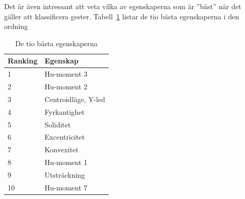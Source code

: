 \documentclass[../rapport_MVEX01-11-05]{subfiles}
\begin{document}
Det är även intressant att veta vilka av egenskaperna som är ''bäst'' när det
gäller att klassificera gester. Tabell~\ref{tab:bestfeats} listar de tio bästa
egenskaperna i den ordning 

\begin{table}[tb]
	\centering
	\caption{De tio bästa egenskaperna}
	\label{tab:bestfeats}
	\begin{tabular}{ll}
		\toprule
		Ranking & Egenskap \\
		\midrule
		1 & Hu-moment 3 \\
		2 & Hu-moment 2 \\
		3 & Centroidläge, Y-led \\
		4 & Fyrkantighet \\
		5 & Soliditet \\
		6 & Excentricitet \\
		7 & Konvexitet \\
		8 & Hu-moment 1 \\
		9 & Utsträckning \\
		10 & Hu-moment 7 \\
		\bottomrule
	\end{tabular}
\end{table}
\end{document}
